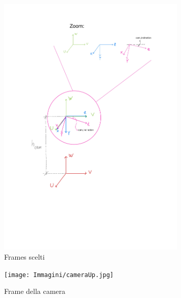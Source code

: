 \begin{figure}[H]
	\centering
	\includegraphics[width=0.8\textwidth]{Immagini/RoboticsFrames-2.jpg}
	\caption{Frames scelti}
	\label{fig:frames}
\end{figure}

\begin{figure}[H]
	\centering
	\texttt{[image: Immagini/cameraUp.jpg]}
	\caption{Frame della camera}
	\label{fig:camera_up}
\end{figure}

